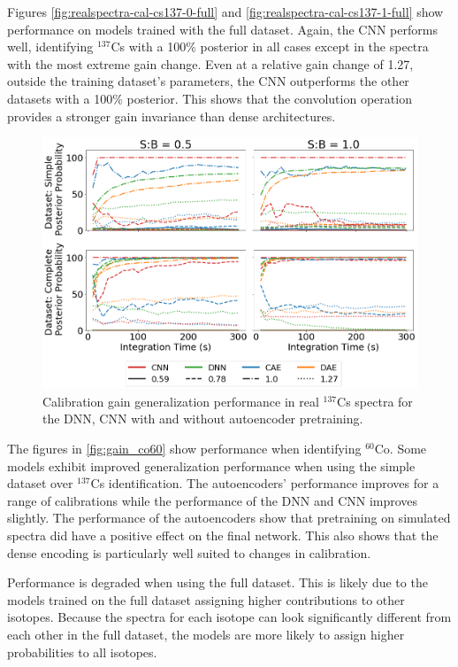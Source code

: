Figures \ref{fig:realspectra-cal-cs137-0-full} and \ref{fig:realspectra-cal-cs137-1-full} show performance on models trained with the full dataset. Again, the CNN performs well, identifying $^{137}$Cs with a 100\% posterior in all cases except in the spectra with the most extreme gain change. Even at a relative gain change of 1.27, outside the training dataset's parameters, the CNN outperforms the other datasets with a 100\% posterior. This shows that the convolution operation provides a stronger gain invariance than dense architectures. 

\begin{figure}[H]
	\centering
	\includegraphics[width=1.0\linewidth]{images/realspectra-cal-cs137}
	\caption{Calibration gain generalization performance in real $^{137}$Cs spectra for the DNN, CNN with and without autoencoder pretraining.}
	\label{fig:realspectra-cal-cs137}
\end{figure}


The figures in \ref{fig:gain_co60} show performance when identifying $^{60}$Co. Some models exhibit improved generalization performance when using the simple dataset over $^{137}$Cs identification. The autoencoders' performance improves for a range of calibrations while the performance of the DNN and CNN improves slightly. The performance of the autoencoders show that pretraining on simulated spectra did have a positive effect on the final network. This also shows that the dense encoding is particularly well suited to changes in calibration.

Performance is degraded when using the full dataset. This is likely due to the models trained on the full dataset assigning higher contributions to other isotopes. Because the spectra for each isotope can look significantly different from each other in the full dataset, the models are more likely to assign higher probabilities to all isotopes.

